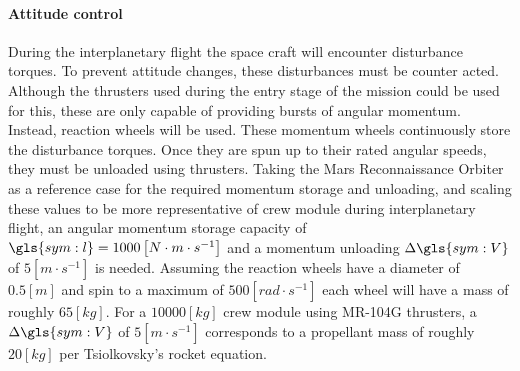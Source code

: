 \paragraph{Attitude control}
During the interplanetary flight the space craft will encounter disturbance torques. To prevent attitude changes, these disturbances must be counter acted. Although the thrusters used during the entry stage of the mission could be used for this, these are only capable of providing bursts of angular momentum. Instead, reaction wheels will be used. These momentum wheels continuously store the disturbance torques. Once they are spun up to their rated angular speeds, they must be unloaded using thrusters. Taking the Mars Reconnaissance Orbiter \cite{You2007} as a reference case for the required momentum storage and unloading, and scaling these values to be more representative of crew module during interplanetary flight, an angular momentum storage capacity of $\gls{sym:l} = 1000 \left[N \cdot m\cdot s^{-1}\right]$ and a momentum unloading $\Delta\gls{sym:V}$ of $5 \left[m\cdot s^{-1}\right]$ is needed. Assuming the reaction wheels have a diameter of $0.5 \left[m\right]$ and spin to a maximum of $500 \left[rad \cdot s^{-1}\right]$ each wheel will have a mass of roughly $65 \left[kg\right]$. For a $10 000 \left[kg\right]$ crew module using MR-104G thrusters, a $\Delta\gls{sym:V}$ of $5 \left[m\cdot s^{-1}\right]$ corresponds to a propellant mass of roughly $20 \left[kg\right]$ per Tsiolkovsky's rocket equation. 